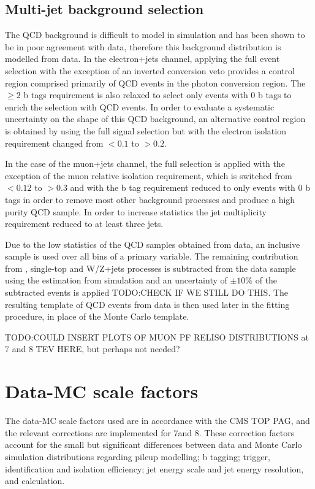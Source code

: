 \subsection{Multi-jet background selection}
\label{ss:background_selection}
The QCD background is difficult to model in simulation and has been shown to be in poor agreement with data,
therefore this background distribution is modelled from data. In the electron+jets channel, applying the full
event selection with the exception of an inverted conversion veto provides a control region comprised
primarily of QCD events in the photon conversion region. The $\geq 2$ b tags requirement is also
relaxed to select only events with 0 b tags to enrich the selection with QCD events.
In order to evaluate a systematic uncertainty on the shape of this QCD background, an alternative control region
is obtained by using the full signal selection but with the electron isolation requirement changed from $<
0.1$ to $> 0.2$.

In the case of the muon+jets channel, the full selection is applied with the exception of the muon relative
isolation requirement, which is switched from $< 0.12$ to $> 0.3$ and with the b tag requirement reduced to
only events with 0 b tags in order to remove most other \ttbar background processes and produce a high purity
QCD sample. In order to increase statistics the jet multiplicity requirement reduced to at least three jets.

Due to the low statistics of the QCD samples obtained from data, an inclusive sample is used over all bins of
a primary variable. The remaining contribution from \ttbar, single-top and W/Z+jets processes is subtracted
from the data sample using the estimation from simulation and an uncertainty of $\pm10\%$ of the subtracted
events is applied TODO:CHECK IF WE STILL DO THIS. %
The resulting template of QCD events from data is then used later in the fitting procedure, in place of the
Monte Carlo template.

TODO:COULD INSERT PLOTS OF MUON PF RELISO DISTRIBUTIONS at 7 and 8 TEV HERE, but perhaps not needed?


\section{Data-MC scale factors}
\label{s:data_mc_scale_factors}
The data-MC scale factors used are in accordance with the CMS TOP PAG, and the relevant corrections are
implemented for 7\TeV and 8\TeV. These correction factors account for the small but significant differences
between data and Monte Carlo simulation distributions regarding pileup modelling; b tagging; trigger,
identification and isolation efficiency; jet energy scale and jet energy resolution, and \met calculation.

